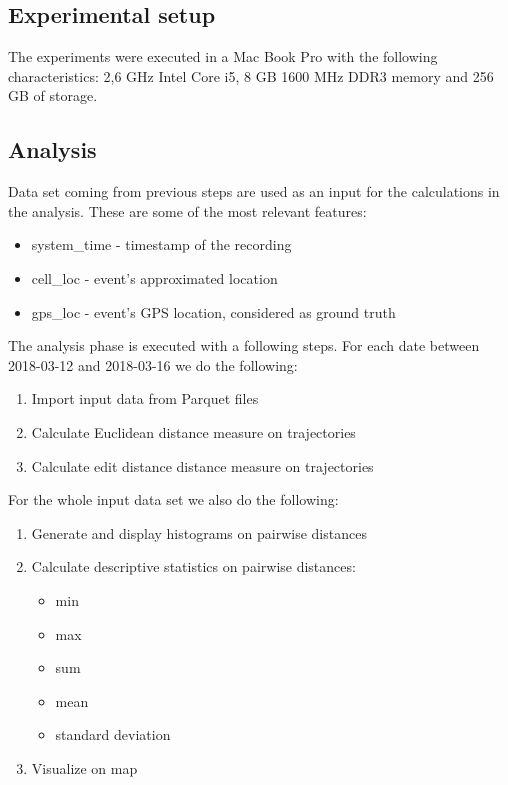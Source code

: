 \subsection{Experimental setup}
The experiments were executed in a Mac Book Pro with the following characteristics: 2,6 GHz Intel Core i5, 8 GB 1600 MHz DDR3 memory and 256 GB of storage.

\subsection{Analysis}
Data set coming from previous steps are used as an input for the calculations in the analysis. These are some of the most relevant features:
\begin{itemize}
    \item system\_time - timestamp of the recording
    \item cell\_loc - event's approximated location
    \item gps\_loc - event's GPS location, considered as ground truth
\end{itemize}

The analysis phase is executed with a following steps. For each date between 2018-03-12 and 2018-03-16 we do the following:
\begin{enumerate}
    \item Import input data from Parquet files
    \item Calculate Euclidean distance measure on trajectories
    \item Calculate edit distance distance measure on trajectories
\end{enumerate}

For the whole input data set we also do the following:
\begin{enumerate}
   \item Generate and display histograms on pairwise distances
    \item Calculate descriptive statistics on pairwise distances:
        \begin{itemize}
            \item min
            \item max
            \item sum
            \item mean
            \item standard deviation
        \end{itemize}
    \item Visualize on map
\end{enumerate}
    
